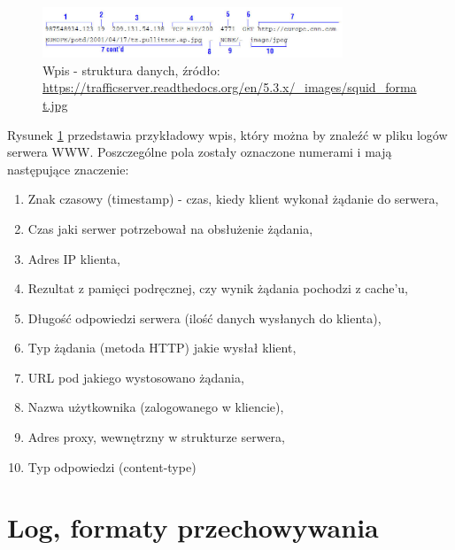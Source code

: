     \begin{figure}[H]
        \centering
        \includegraphics[width=0.80\textwidth]{images/log_data_structure}
        \caption[Wpis w logu jako struktura danych]{
            Wpis - struktura danych, źródło: \url{https://trafficserver.readthedocs.org/en/5.3.x/_images/squid_format.jpg}
        }
        \label{chapter:logs:history:log_as_data_structure_picture}
    \end{figure}
    
    Rysunek \ref{chapter:logs:history:log_as_data_structure_picture} przedstawia przykładowy wpis, który można by znaleźć
    w pliku logów serwera WWW. Poszczególne pola zostały oznaczone numerami i mają następujące znaczenie:
    \begin{enumerate}
        \item Znak czasowy (timestamp) - czas, kiedy klient wykonał żądanie do serwera,
        \item Czas jaki serwer potrzebował na obsłużenie żądania,
        \item Adres IP klienta,
        \item Rezultat z pamięci podręcznej, czy wynik żądania pochodzi z cache'u,
        \item Długość odpowiedzi serwera (ilość danych wysłanych do klienta),
        \item Typ żądania (metoda HTTP) jakie wysłał klient,
        \item URL pod jakiego wystosowano żądania,
        \item Nazwa użytkownika (zalogowanego w kliencie),
        \item Adres proxy, wewnętrzny w strukturze serwera,
        \item Typ odpowiedzi (content-type)
    \end{enumerate}
    
\section{Log, formaty przechowywania}

